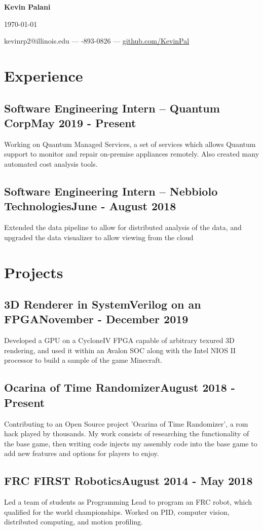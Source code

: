 \documentclass[letterpaper,12pt]{article}
\makeatletter
\newcommand\textbox[1]{%
    \parbox{.333\textwidth}{#1}%
}
\renewcommand{\maketitle}{
    \begin{center}
        \noindent\textbox{\hfill}\textbox{\hfil\bfseries\huge Kevin Palani \hfil}\vspace{3mm}\textbox{\hfill \today}
        {\faEnvelope \enskip kevinrp2@illinois.edu --- \faPhone \enskip 408-893-0826 --- \faGithub \enskip \underline{\href{https://github.com/KevinPal}{github.com/KevinPal}}}
    \end{center} }
\makeatother
\begin{document}
\maketitle
\section{Experience}
    \subsection{Software Engineering Intern -- Quantum Corp\null\hfill May 2019 - Present}
    Working on Quantum Managed Services, a set of services which allows Quantum support to monitor and repair on-premise appliances remotely. Also created many automated cost analysis tools.
    \vspace*{-2mm}
    \subsection{Software Engineering Intern -- Nebbiolo Technologies\null\hfill June - August 2018}
    Extended the data pipeline to allow for distributed analysis of the data, and upgraded the data visualizer to allow viewing from the cloud
    \vspace*{-2mm}
\section{Projects}
    \subsection{3D Renderer in SystemVerilog on an FPGA\null\hfill November - December 2019}
    Developed a GPU on a CycloneIV FPGA capable of arbitrary texured 3D rendering, and used it within an Avalon SOC along with the Intel NIOS II processor to build a sample of the game Minecraft.
    \vspace*{-2mm}
    \subsection{Ocarina of Time Randomizer\null\hfill August 2018 - Present}
    Contributing to an Open Source project 'Ocarina of Time Randomizer', a rom hack played by thousands. My work consists of researching the functionality of the base game, then writing code injects my assembly code into the base game to add new features and options for players to enjoy.
    \vspace*{-2mm}
    \subsection{FRC FIRST Robotics\null\hfill August 2014 - May 2018}
    Led a team of students as Programming Lead to program an FRC robot, which qualified for the world championships. Worked on PID, computer vision, distributed computing, and motion profiling.
    \vspace*{-2mm}
\end{document}
